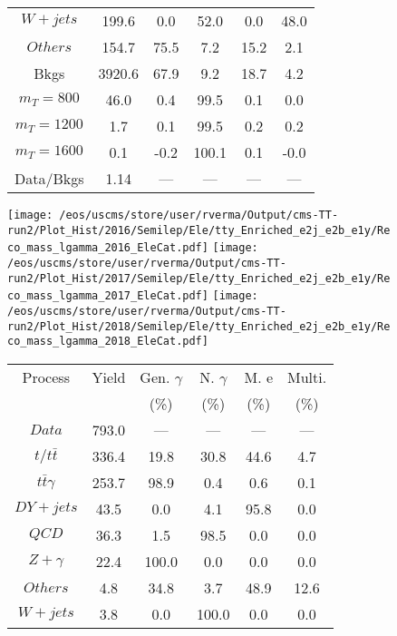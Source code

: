 \begin{figure}
\begin{minipage}[c]{0.32\textwidth}
{\begin{tabular}{cccccc}
$ W+jets $ &  199.6 &  0.0 &  52.0 &  0.0 &  48.0\\
$ Others $ &  154.7 &  75.5 &  7.2 &  15.2 &  2.1\\
Bkgs &  3920.6 &  67.9 &  9.2 &  18.7 &  4.2\\
$ m_{T} = 800 $ &  46.0 &  0.4 &  99.5 &  0.1 &  0.0\\
$ m_{T} = 1200 $ &  1.7 &  0.1 &  99.5 &  0.2 &  0.2\\
$ m_{T} = 1600 $ &  0.1 &  -0.2 &  100.1 &  0.1 &  -0.0\\
Data/Bkgs &  1.14 &  --- &  --- &  --- &  ---\\
\hline
\end{tabular}
}
\end{minipage}
\end{figure}

\begin{figure}
\centering
\texttt{[image: /eos/uscms/store/user/rverma/Output/cms-TT-run2/Plot\_Hist/2016/Semilep/Ele/tty\_Enriched\_e2j\_e2b\_e1y/Reco\_mass\_lgamma\_2016\_EleCat.pdf]}
\texttt{[image: /eos/uscms/store/user/rverma/Output/cms-TT-run2/Plot\_Hist/2017/Semilep/Ele/tty\_Enriched\_e2j\_e2b\_e1y/Reco\_mass\_lgamma\_2017\_EleCat.pdf]}
\texttt{[image: /eos/uscms/store/user/rverma/Output/cms-TT-run2/Plot\_Hist/2018/Semilep/Ele/tty\_Enriched\_e2j\_e2b\_e1y/Reco\_mass\_lgamma\_2018\_EleCat.pdf]}
\begin{minipage}[c]{0.32\textwidth}
\centering
\tiny{
\begin{tabular}{cccccc}
\hline
Process & Yield & Gen. $\gamma$ & N. $\gamma$ & M. e & Multi. \\
 &  & (\%) & (\%) & (\%) & (\%)  \\
\hline
                                                                      $ Data $ &  793.0 &  --- &  --- &  --- &  ---\\
$ t/t\bar{t} $ &  336.4 &  19.8 &  30.8 &  44.6 &  4.7\\
$ t\bar{t}\gamma $ &  253.7 &  98.9 &  0.4 &  0.6 &  0.1\\
$ DY+jets $ &  43.5 &  0.0 &  4.1 &  95.8 &  0.0\\
$ QCD $ &  36.3 &  1.5 &  98.5 &  0.0 &  0.0\\
$ Z+\gamma $ &  22.4 &  100.0 &  0.0 &  0.0 &  0.0\\
$ Others $ &  4.8 &  34.8 &  3.7 &  48.9 &  12.6\\
$ W+jets $ &  3.8 &  0.0 &  100.0 &  0.0 &  0.0\\

\end{tabular}}
\end{minipage}
\end{figure}
